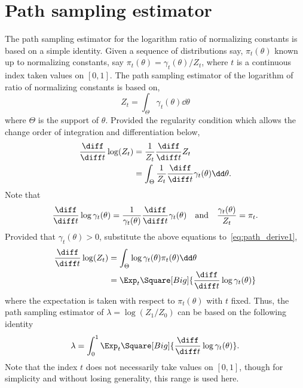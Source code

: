 \section{Path sampling estimator}
\label{sec:Path sampling estimator}

The path sampling estimator for the logarithm ratio of normalizing constants
is based on a simple identity. Given a sequence of distributions say,
$\pi_t(\theta)$ known up to normalizing constants, say $\pi_t(\theta) =
\gamma_t(\theta)/Z_t$, where $t$ is a continuous index taken values on
$[0,1]$. The path sampling estimator of the logarithm of ratio of normalizing
constants is based on,
\begin{equation}
  Z_t = \int_{\Theta}\gamma_t(\theta)\dd \theta
\end{equation}
where $\Theta$ is the support of $\theta$. Provided the regularity condition
which allows the change order of integration and differentiation below,
\begin{align}
  \frac{\diff}{\diff t}\log(Z_t)
  &= \frac{1}{Z_t}\frac{\diff}{\diff t}Z_t \notag\\
  &= \int_{\Theta}\frac{1}{Z_t}
  \frac{\diff}{\diff t}\gamma_t(\theta)\dd\theta.
  \label{eq:path_derive1}
\end{align}
Note that
\begin{equation}
  \frac{\diff}{\diff t}\log\gamma_t(\theta)
  = \frac{1}{\gamma_t(\theta)}\frac{\diff}{\diff t}\gamma_t(\theta)
  \quad\text{and}\quad
  \frac{\gamma_t(\theta)}{Z_t} = \pi_t.
\end{equation}
Provided that $\gamma_t(\theta)>0$, substitute the above equations
to~\eqref{eq:path_derive1},
\begin{align}
  \frac{\diff}{\diff t}\log(Z_t)
  &= \int_{\Theta}\log\gamma_t(\theta)\pi_t(\theta)\dd\theta \notag\\
  &= \Exp_t\Square[Big]{\frac{\diff}{\diff t}\log\gamma_t(\theta)}
\end{align}
where the expectation is taken with respect to $\pi_t(\theta)$ with $t$ fixed.
Thus, the path sampling estimator of $\lambda=\log(Z_1/Z_0)$ can be based on
the following identity
\begin{equation}
  \lambda=
  \int_0^1 \Exp_t\Square[Big]{\frac{\diff}{\diff t}\log \gamma_t(\theta)}.
  \label{eq:z_path}
\end{equation}
Note that the index $t$ does not necessarily take values on $[0,1]$, though
for simplicity and without losing generality, this range is used here.

